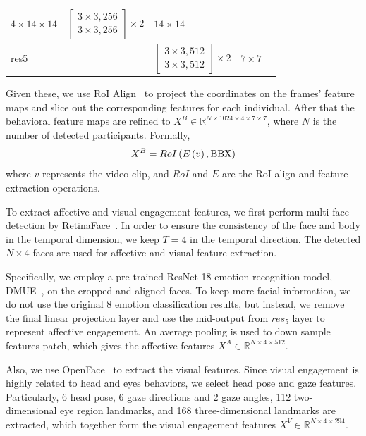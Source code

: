 \documentclass[VANCOUVER,STIX1COL]{WileyNJD-v2}
\begin{document}
\begin{table}[htb]
\begin{tabular}{>{\centering}p{} >{\centering}p{} >{\centering}p{} >{\centering}p{} >{\centering\arraybackslash}p{}}
  $4\times14\times14$ &
  $\left[ \begin{array}{c} 3\times3, 256 \\ 3\times3, 256 \end{array}\right]\times2$ &
  $14\times14$ \\
  \midrule
  res5 &
  \multicolumn{2}{c}{pruned} &
  $\left[ \begin{array}{c} 3\times3, 512 \\ 3\times3, 512 \end{array}\right]\times2$ &
  $7\times7$ \\
  \bottomrule
  \end{tabular}
\end{table}

Given these, we use RoI Align~\cite{He2017Mask} to project the coordinates on the frames' feature maps and slice out the corresponding features for each individual. After that the behavioral feature maps are refined to $X^B \in \mathbb{R}^{N\times1024\times4\times7\times7}$, where $N$ is the number of detected participants. Formally,
\begin{equation}
  X^B = RoI\left(E\left(v\right), {\rm BBX}\right)
\end{equation}
where $v$ represents the video clip, and $RoI$ and $E$ are the RoI align and feature extraction operations.

To extract affective and visual engagement features, we first perform multi-face detection by RetinaFace~\cite{Deng2020RetinaFace}. In order to ensure the consistency of the face and body in the temporal dimension, we keep $T = 4$ in the temporal direction. The detected $N\times4$ faces are used for affective and visual feature extraction.

Specifically, we employ a pre-trained ResNet-18 emotion recognition model, DMUE~\cite{She2021Dive}, on the cropped and aligned faces. To keep more facial information, we do not use the original 8 emotion classification results, but instead, we remove the final linear projection layer and use the mid-output from $res_5$ layer to represent affective engagement. An average pooling is used to down sample features patch, which gives the affective features $X^A \in \mathbb{R}^{N\times4\times512}$.

Also, we use OpenFace~\cite{Baltrusaitis2018OpenFace} to extract the visual features. Since visual engagement is highly related to head and eyes behaviors, we select head pose and gaze features. Particularly, 6 head pose, 6 gaze directions and 2 gaze angles, 112 two-dimensional eye region landmarks, and 168 three-dimensional landmarks are extracted, which together form the visual engagement features $X^V \in \mathbb{R}^{N\times4\times294}$.
\end{document}

